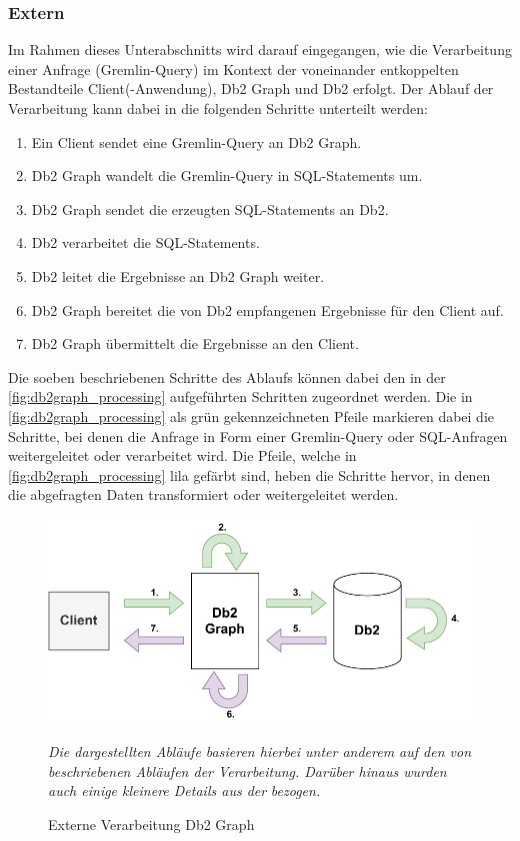 \subsubsection{Extern}
Im Rahmen dieses Unterabschnitts wird darauf eingegangen, wie die Verarbeitung einer Anfrage (Gremlin-Query) im Kontext der voneinander entkoppelten Bestandteile Client(-Anwendung), Db2 Graph und Db2 erfolgt. Der Ablauf der Verarbeitung kann dabei in die folgenden Schritte unterteilt werden: 
\begin{enumerate}
    \item Ein Client sendet eine Gremlin-Query an Db2 Graph. 
    \item Db2 Graph wandelt die Gremlin-Query in SQL-Statements um. 
    \item Db2 Graph sendet die erzeugten SQL-Statements an Db2.
    \item Db2 verarbeitet die SQL-Statements.
    \item Db2 leitet die Ergebnisse an Db2 Graph weiter.
    \item Db2 Graph bereitet die von Db2 empfangenen Ergebnisse für den Client auf. 
    \item Db2 Graph übermittelt die Ergebnisse an den Client.
\end{enumerate}

Die soeben beschriebenen Schritte des Ablaufs können dabei den in der \autoref{fig:db2graph_processing} aufgeführten Schritten zugeordnet werden. Die in \autoref{fig:db2graph_processing} als grün gekennzeichneten Pfeile markieren dabei die Schritte, bei denen die Anfrage in Form einer Gremlin-Query oder SQL-Anfragen weitergeleitet oder verarbeitet wird. Die Pfeile, welche in \autoref{fig:db2graph_processing} lila gefärbt sind, heben die Schritte hervor, in denen die abgefragten Daten transformiert oder weitergeleitet werden.

\begin{figure}[ht]
    \centering
    \includegraphics[width=\textwidth]{images/db2graph_processing.pdf}
    \caption{Externe Verarbeitung Db2 Graph}
    \label{fig:db2graph_processing}
    \vspace{1em}
    \textit{Die dargestellten Abläufe basieren hierbei unter anderem auf den von}  \textit{beschriebenen Abläufen der Verarbeitung. Darüber hinaus wurden auch einige kleinere Details aus der}  \textit{bezogen.} 
\end{figure}

